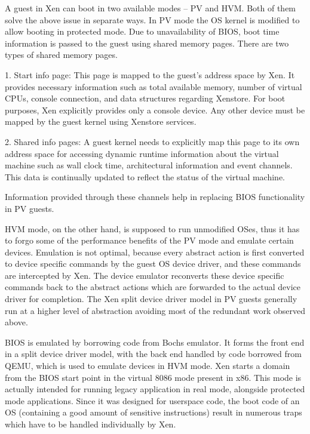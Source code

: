  

A guest in Xen can boot in two available modes – PV and HVM. Both of them solve the above issue in separate ways. In PV mode the OS kernel is modified to allow booting in protected mode. Due to unavailability of BIOS, boot time information is passed to the guest using shared memory pages. There are two types of shared memory pages. 

1. Start info page: This page is mapped to the guest’s address space by Xen. It provides necessary information such as total available memory, number of virtual CPUs, console connection, and data structures regarding Xenstore. For boot purposes, Xen explicitly provides only a console device. Any other device must be mapped by the guest kernel using Xenstore services.  

2. Shared info pages: A guest kernel needs to explicitly map this page to its own address space for accessing dynamic runtime information about the virtual machine such as wall clock time, architectural information and event channels. This data is continually updated to reflect the status of the virtual machine. 

 

Information provided through these channels help in replacing BIOS functionality in PV guests. 

 

HVM mode, on the other hand, is supposed to run unmodified OSes, thus it has to forgo some of the performance benefits of the PV mode and emulate certain devices. Emulation is not optimal, because every abstract action is first converted to device specific commands by the guest OS device driver, and these commands are intercepted by Xen. The device emulator reconverts these device specific commands back to the abstract actions which are forwarded to the actual device driver for completion. The Xen split device driver model in PV guests generally run at a higher level of abstraction avoiding most of the redundant work observed above. 

 

BIOS is emulated by borrowing code from Bochs emulator. It forms the front end in a split device driver model, with the back end handled by code borrowed from QEMU, which is used to emulate devices in HVM mode. Xen starts a domain from the BIOS start point in the virtual 8086 mode present in x86. This mode is actually intended for running legacy application in real mode, alongside protected mode applications. Since it was designed for userspace code, the boot code of an OS (containing a good amount of sensitive instructions) result in numerous traps which have to be handled individually by Xen. 

